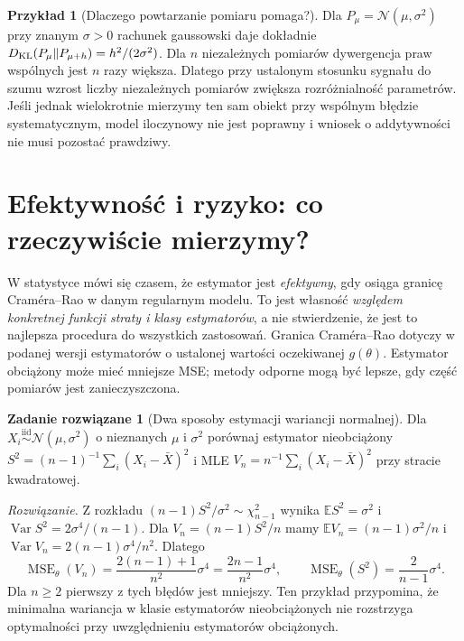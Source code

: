 \documentclass[11pt,a4paper,oneside]{report}
\numberwithin{equation}{chapter}
\theoremstyle{plain}
\theoremstyle{definition}
\newtheorem{przyklad}{Przykład}[chapter]
\newtheorem{zadanie}{Zadanie rozwiązane}[chapter]
\theoremstyle{remark}
\newcommand{\E}{\mathbb E}
\newcommand{\Var}{\operatorname{Var}}
\newcommand{\Normal}{\mathcal N}
\newcommand{\iid}{\mathrel{\overset{\mathrm{iid}}\sim}}
\DeclareMathOperator{\MSE}{MSE}
\begin{document}
\begin{przyklad}[Dlaczego powtarzanie pomiaru pomaga?]
Dla $P_\mu=\Normal(\mu,\sigma^2)$ przy znanym $\sigma>0$
rachunek gaussowski daje dokładnie
$D_{\rm KL}(P_\mu\|P_{\mu+h})=h^2/(2\sigma^2)$.
Dla $n$ niezależnych pomiarów dywergencja praw wspólnych jest
$n$ razy większa. Dlatego przy ustalonym stosunku sygnału
do szumu wzrost liczby niezależnych pomiarów zwiększa
rozróżnialność parametrów. Jeśli jednak wielokrotnie mierzymy
ten sam obiekt przy wspólnym błędzie systematycznym, model
iloczynowy nie jest poprawny i wniosek o addytywności nie musi
pozostać prawdziwy.
\end{przyklad}

\section{Efektywność i ryzyko: co rzeczywiście mierzymy?}
W statystyce mówi się czasem, że estymator jest \emph{efektywny},
gdy osiąga granicę Craméra--Rao w danym regularnym modelu.
To jest własność \emph{względem konkretnej funkcji straty i klasy
estymatorów}, a nie stwierdzenie, że jest to najlepsza procedura
do wszystkich zastosowań. Granica Craméra--Rao dotyczy w podanej
wersji estymatorów o ustalonej wartości oczekiwanej $g(\theta)$.
Estymator obciążony może mieć mniejsze MSE; metody odporne mogą
być lepsze, gdy część pomiarów jest zanieczyszczona.

\begin{zadanie}[Dwa sposoby estymacji wariancji normalnej]
Dla $X_i\iid\Normal(\mu,\sigma^2)$ o nieznanych $\mu$ i
$\sigma^2$ porównaj estymator nieobciążony
$S^2=(n-1)^{-1}\sum_i(X_i-\bar X)^2$ i MLE
$V_n=n^{-1}\sum_i(X_i-\bar X)^2$ przy stracie kwadratowej.
\par\emph{Rozwiązanie.} Z rozkładu
$(n-1)S^2/\sigma^2\sim\chi^2_{n-1}$ wynika
$\E S^2=\sigma^2$ i $\Var S^2=2\sigma^4/(n-1)$.
Dla $V_n=(n-1)S^2/n$ mamy
$\E V_n=(n-1)\sigma^2/n$ i
$\Var V_n=2(n-1)\sigma^4/n^2$. Dlatego
\[
\MSE_\theta(V_n)=\frac{2(n-1)+1}{n^2}\sigma^4
=\frac{2n-1}{n^2}\sigma^4,
\qquad
\MSE_\theta(S^2)=\frac{2}{n-1}\sigma^4.
\]
Dla $n\ge2$ pierwszy z tych błędów jest mniejszy.
Ten przykład przypomina, że minimalna wariancja w klasie
estymatorów nieobciążonych nie rozstrzyga optymalności przy
uwzględnieniu estymatorów obciążonych.
\end{zadanie}
\end{document}

